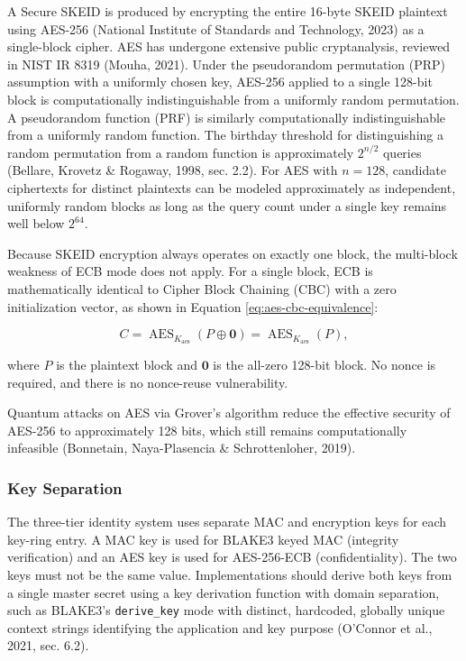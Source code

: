 \documentclass[fleqn,10pt]{wlpeerj}
\begin{document}
A Secure SKEID is produced by encrypting the entire 16-byte SKEID
plaintext using AES-256 (National Institute of Standards and Technology,
2023) as a single-block cipher. AES has undergone extensive public
cryptanalysis, reviewed in NIST IR 8319 (Mouha, 2021). Under the
pseudorandom permutation (PRP) assumption with a uniformly chosen key,
AES-256 applied to a single 128-bit block is computationally
indistinguishable from a uniformly random permutation. A pseudorandom
function (PRF) is similarly computationally indistinguishable from a
uniformly random function. The birthday threshold for distinguishing a
random permutation from a random function is approximately \(2^{n/2}\)
queries (Bellare, Krovetz \& Rogaway, 1998, sec. 2.2). For AES with
\(n = 128\), candidate ciphertexts for distinct plaintexts can be
modeled approximately as independent, uniformly random blocks as long as
the query count under a single key remains well below \(2^{64}\).

Because SKEID encryption always operates on exactly one block, the
multi-block weakness of ECB mode does not apply. For a single block, ECB
is mathematically identical to Cipher Block Chaining (CBC) with a zero
initialization vector, as shown in Equation
\eqref{eq:aes-cbc-equivalence}:

\begin{equation}
\label{eq:aes-cbc-equivalence}
C = \operatorname{AES}_{K_{\mathrm{aes}}}(P \oplus \mathbf{0})
  = \operatorname{AES}_{K_{\mathrm{aes}}}(P),
\end{equation}

where \(P\) is the plaintext block and \(\mathbf{0}\) is the all-zero
128-bit block. No nonce is required, and there is no nonce-reuse
vulnerability.

Quantum attacks on AES via Grover's algorithm reduce the effective
security of AES-256 to approximately 128 bits, which still remains
computationally infeasible (Bonnetain, Naya-Plasencia \& Schrottenloher,
2019).

\subsubsection{Key Separation}\label{key-separation}

The three-tier identity system uses separate MAC and encryption keys for
each key-ring entry. A MAC key is used for BLAKE3 keyed MAC (integrity
verification) and an AES key is used for AES-256-ECB (confidentiality).
The two keys must not be the same value. Implementations should derive
both keys from a single master secret using a key derivation function
with domain separation, such as BLAKE3's \texttt{derive\_key} mode with
distinct, hardcoded, globally unique context strings identifying the
application and key purpose (O'Connor et al., 2021, sec. 6.2).
\end{document}
